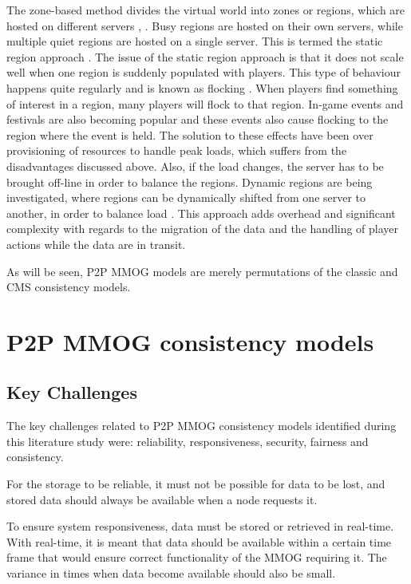 \documentclass[journal,oneside,a4paper,onecolumn]{IEEEtran}
\begin{document}
The zone-based method divides the virtual world into zones or regions, which are hosted on different servers \cite{zone_based_stat}, \cite{zone_based_dyn}. Busy regions are hosted on their own servers, while multiple quiet regions are hosted on a single server. This is termed the static region approach \cite{zone_based_stat}. The issue of the static region approach is that it does not scale well when one region is suddenly populated with players. This type of behaviour happens quite regularly and is known as flocking \cite{flocking}. When players find something of interest in a region, many players will flock to that region. In-game events and festivals are also becoming popular and these events also cause flocking to the region where the event is held. The solution to these effects have been over provisioning of resources to handle peak loads, which suffers from the disadvantages discussed above. Also, if the load changes, the server has to be brought off-line in order to balance the regions. Dynamic regions are being investigated, where regions can be dynamically shifted from one server to another, in order to balance load \cite{zone_based_dyn}. This approach adds overhead and significant complexity with regards to the migration of the data and the handling of player actions while the data are in transit.

As will be seen, P2P MMOG models are merely permutations of the classic and \ac{CMS} consistency models.

\section{P2P MMOG consistency models}
\label{p2p_mmog_cm}

\subsection{Key Challenges}
\label{key_challenges_cm}

The key challenges related to P2P MMOG consistency models identified during this literature study were: reliability, responsiveness, security, fairness and consistency.

For the storage to be reliable, it must not be possible for data to be lost, and stored data should always be available when a node requests it.

To ensure system responsiveness, data must be stored or retrieved in real-time. With real-time, it is meant that data should be available within a certain time frame that would ensure correct functionality of the MMOG requiring it. The variance in times when data become available should also be small.
\end{document}
